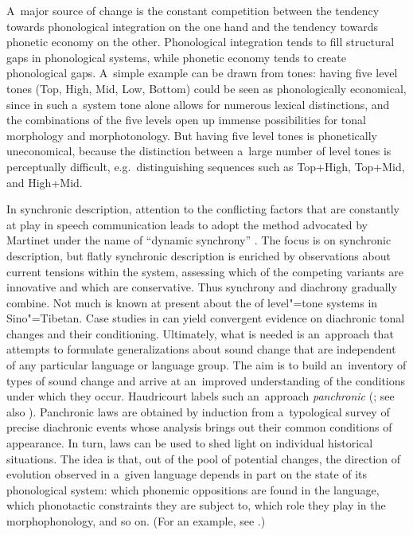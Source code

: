 A~major source of change is the constant competition between the tendency
towards phonological integration on the one hand and the tendency towards phonetic economy on the
other. Phonological integration tends to fill structural gaps in phonological systems, while
phonetic economy tends to create phonological gaps. A~simple example can be drawn from tones: having five level tones (Top, High, Mid, Low, Bottom) could be seen as phonologically economical, since in such a~system tone alone allows
for numerous lexical distinctions, and the combinations of the five levels open up immense possibilities for tonal morphology and morphotonology. But having five level tones is phonetically uneconomical, because the distinction
between a~large number of level tones is perceptually difficult, e.g.~distinguishing sequences such as
Top+High, Top+Mid, and High+Mid.

In synchronic description, attention to the conflicting factors that are constantly at play in speech communication leads to adopt the method advocated by
Martinet under the name of “dynamic synchrony” \citep{martinet1990}. The focus is on synchronic
description, but flatly synchronic description is enriched by observations about current tensions within
the system, assessing which of the competing variants are innovative and which are {conservative}. Thus synchrony and {diachrony} gradually combine. Not much is known at present about the  of level"=tone systems in Sino"={Tibetan}. Case studies in  can yield convergent evidence on {diachronic} tonal changes and their conditioning. Ultimately, what is needed is an~approach that attempts to formulate generalizations about sound
change that are independent of any particular language or language group. The aim is to build
an~inventory of types of sound change and arrive at an~improved understanding of the
conditions under which they occur. Haudricourt labels such an~approach \textit{panchronic}
(\citealt{haudricourt1940,haudricourt1973b}; see also \citealt{hagegeetal1978}). Panchronic laws are
obtained by induction from a~typological survey of precise {diachronic} events whose analysis brings
out their common conditions of appearance. In turn,  laws can be used to shed light on
individual historical situations. The idea is that, out of the pool of potential changes, the direction of evolution observed in a~given language depends in part on the state of its phonological system: which phonemic oppositions are found in the language, which phonotactic constraints they are subject to, which role they play in the morphophonology, and so on. (For an example, see \citealt{jacques2011a}.) 

